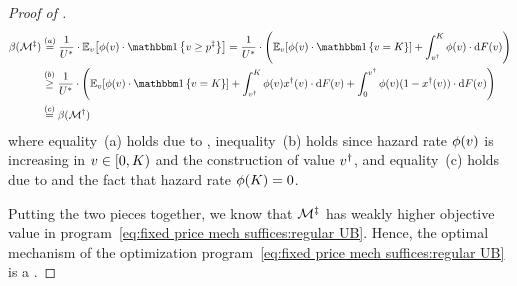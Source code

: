 \begin{proof}[Proof of ]
\begin{align*}
    \residuesurplusratio(\mech\doubleprimed) &\overset{(a)}{=} \frac{1}{\buyerbenchmark}\cdot \expect[\val]{\buyerhazardrate(\val)\cdot \indicator{\val\geq \price\doubleprimed}}
    =
    \frac{1}{\buyerbenchmark}\cdot 
    \left(\expect[\val]{\buyerhazardrate(\val)\cdot \indicator{\val= \constantH}}
    +
    \displaystyle\int_{\val\primed}^{\constantH} \buyerhazardrate(\val)\cdot \d\buyercdf(\val)
    \right)
    \\
    &\overset{(b)}{\geq}
    \frac{1}{\buyerbenchmark}\cdot 
    \left(\expect[\val]{\buyerhazardrate(\val)\cdot \indicator{\val= \constantH}}
    +
    \displaystyle\int_{\val\primed}^{\constantH} \buyerhazardrate(\val)\alloc\primed(\val)\cdot \d\buyercdf(\val)
    +
    \displaystyle\int_0^{\val\primed} \buyerhazardrate(\val)(1-\alloc\primed(\val))\cdot \d\buyercdf(\val)
    \right)
    \\
    &\overset{(c)}{=}
    \residuesurplusratio(\mech\primed)
\end{align*}
where equality~(a) holds due to ,
inequality~(b) holds since hazard rate $\phi(v)$ is increasing in $v\in[0, K)$ and the construction of value $v^\dagger$,
and equality~(c) holds due to  and the fact that hazard rate $\phi(K) = 0$.

Putting the two pieces together, we know that {\FixPrice} $\mathcal{M}^\ddagger$ has weakly higher objective value in program~\eqref{eq:fixed price mech suffices:regular UB}. Hence, the optimal mechanism of the optimization program~\eqref{eq:fixed price mech suffices:regular UB} is a {\FixPrice}. 


\end{proof}
